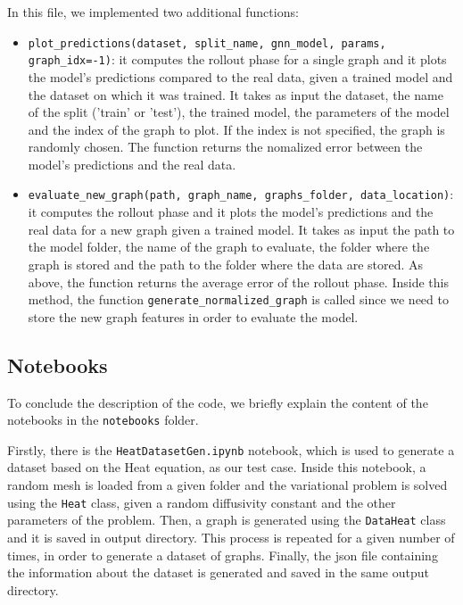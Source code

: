 \documentclass[11pt,a4paper]{article}
\begin{document}
In this file, we implemented two additional functions:
\begin{itemize}
    \item \texttt{plot\_predictions(dataset, split\_name, gnn\_model, params, graph\_idx=-1)}: it computes the rollout phase for a single graph and it plots the model's predictions compared to the real data, given a trained model and the dataset on which it was trained.
    It takes as input the dataset, the name of the split ('train' or 'test'), the trained model, the parameters of the model and the index of the graph to plot. If the index is not specified, the graph is randomly chosen. The function returns the nomalized error between the model's predictions and the real data.
    \item \texttt{evaluate\_new\_graph(path, graph\_name, graphs\_folder, data\_location)}: it computes the rollout phase and it plots the model's predictions and the real data for a new graph given a trained model. It takes as input the path to the model folder, the name of the graph to evaluate, the folder where the graph is stored and the path to the folder where the data are stored. As above, the function returns the average error of the rollout phase. Inside this method, the function \texttt{generate\_normalized\_graph} is called since we need to store the new graph features in order to evaluate the model.
\end{itemize}

\subsection{Notebooks}
To conclude the description of the code, we briefly explain the content of the notebooks in the \texttt{notebooks} folder. 

Firstly, there is the \texttt{HeatDatasetGen.ipynb} notebook, which is used to generate a dataset based on the Heat equation, as our test case. Inside this notebook, a random mesh is loaded from a given folder and the variational problem is solved using the \texttt{Heat} class, given a random diffusivity constant and the other parameters of the problem. Then, a graph is generated using the \texttt{DataHeat} class and it is saved in output directory. This process is repeated for a given number of times, in order to generate a dataset of graphs. Finally, the json file containing the information about the dataset is generated and saved in the same output directory. 

\end{document}
